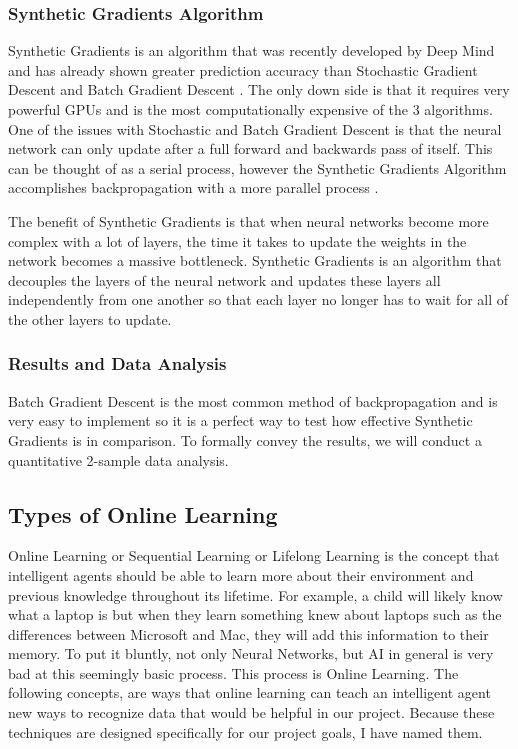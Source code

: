 \documentclass[draftclsnofoot, onecolumn, 10pt, compsoc]{IEEEtran}
\begin{document}
\subsubsection{Synthetic Gradients Algorithm}
Synthetic Gradients is an algorithm that was recently developed by Deep Mind and has already shown greater prediction accuracy than Stochastic Gradient Descent and Batch Gradient Descent \cite{Raval}. The only down side is that it requires very powerful GPUs and is the most computationally expensive of the 3 algorithms. One of the issues with Stochastic and Batch Gradient Descent is that the neural network can only update after a full forward and backwards pass of itself. This can be thought of as a serial process, however the Synthetic Gradients Algorithm accomplishes backpropagation with a more parallel process \cite{Czarnecki}. 

The benefit of Synthetic Gradients is that when neural networks become more complex with a lot of layers, the time it takes to update the weights in the network becomes a massive bottleneck. Synthetic Gradients is an algorithm that decouples the layers of the neural network and updates these layers all independently from one another so that each layer no longer has to wait for all of the other layers to update.

\subsubsection{Results and Data Analysis}
Batch Gradient Descent is the most common method of backpropagation and is very easy to implement so it is a perfect way to test how effective Synthetic Gradients is in comparison. To formally convey the results, we will conduct a quantitative 2-sample data analysis.

\subsection{Types of Online Learning}
Online Learning or Sequential Learning or Lifelong Learning is the concept that intelligent agents should be able to learn more about their environment and previous knowledge throughout its lifetime. For example, a child will likely know what a laptop is but when they learn something knew about laptops such as the differences between Microsoft and Mac, they will add this information to their memory. To put it bluntly, not only Neural Networks, but AI in general is very bad at this seemingly basic process. This process is Online Learning. The following concepts, are ways that online learning can teach an intelligent agent new ways to recognize data that would be helpful in our project. Because these techniques are designed specifically for our project goals, I have named them.
\end{document}
